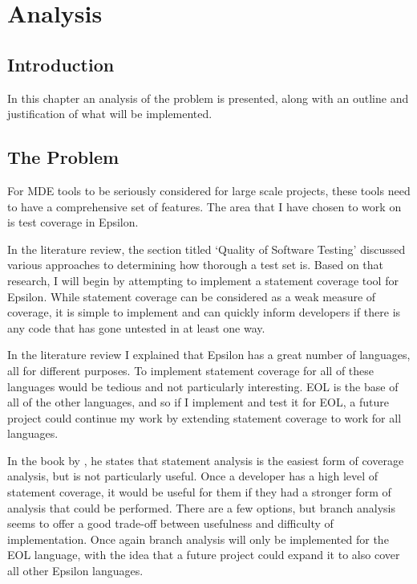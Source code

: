 \chapter{Analysis}

\section{Introduction}
In this chapter an analysis of the problem is presented, along with an outline and justification of what will be implemented.

\section{The Problem}

For MDE tools to be seriously considered for large scale projects, these tools need to have a comprehensive set of features. The area that I have chosen to work on is test coverage in Epsilon.

In the literature review, the section titled `Quality of Software Testing' discussed various approaches to determining how thorough a test set is. Based on that research, I will begin by attempting to implement a statement coverage tool for Epsilon. While statement coverage can be considered as a weak measure of coverage, it is simple to implement and can quickly inform developers if there is any code that has gone untested in at least one way.


In the literature review I explained that Epsilon has a great number of languages, all for different purposes. To implement statement coverage for all of these languages would be tedious and not particularly interesting. EOL is the base of all of the other languages, and so if I implement and test it for EOL, a future project could continue my work by extending statement coverage to work for all languages.

In the book by \citet{Myers:2004:AST:983238}, he states that statement analysis is the easiest form of coverage analysis, but is not particularly useful. Once a developer has a high level of statement coverage, it would be useful for them if they had a stronger form of analysis that could be performed. There are a few options, but branch analysis seems to offer a good trade-off between usefulness and difficulty of implementation. Once again branch analysis will only be implemented for the EOL language, with the idea that a future project could expand it to also cover all other Epsilon languages.

